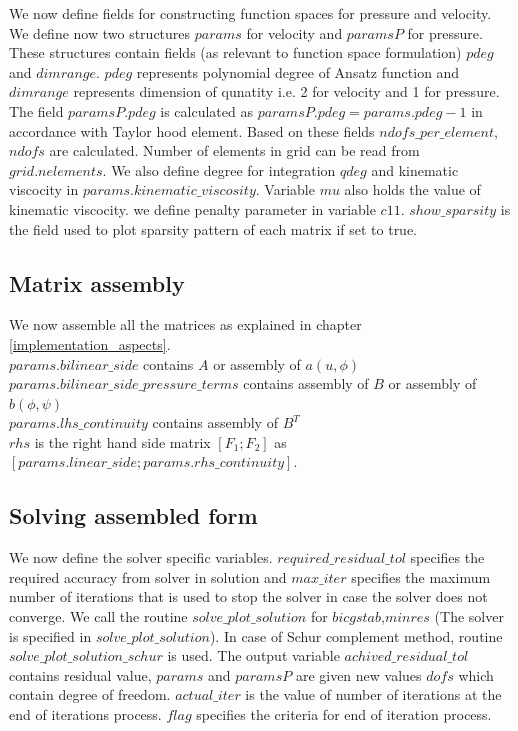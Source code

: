 \documentclass[a4paper,12pt]{book}
\begin{document}
We now define fields for constructing function spaces for pressure and velocity. We define now two structures $params$ for velocity and $paramsP$ for pressure. These structures contain fields (as relevant to function space formulation) $pdeg$ and $dimrange$. $pdeg$ represents polynomial degree of Ansatz function and $dimrange$ represents  dimension of qunatity i.e. 2 for velocity and 1 for pressure. The field $paramsP.pdeg$ is calculated as $paramsP.pdeg = params.pdeg - 1$ in accordance with Taylor hood element. Based on these fields $ndofs\_per\_element$, $ndofs$ are calculated. Number of elements in grid can be read from $grid.nelements$. We also define degree for integration $qdeg$ and kinematic viscocity in $params.kinematic\_viscosity$. Variable $mu$ also holds the value of kinematic viscocity. we define penalty parameter in variable $c11$. $show\_sparsity$ is the field used to plot sparsity pattern of each matrix if set to true.\\

\subsection{Matrix assembly}

We now assemble all the matrices as explained in chapter \ref{implementation_aspects}. \\$params.bilinear\_side$ contains $A$ or assembly of $a(u,\phi)$\\$params.bilinear\_side\_pressure\_terms$ contains assembly of $B$ or assembly of $b(\phi,\psi)$\\ $params.lhs\_continuity$ contains assembly of $B^T$\\ $rhs$ is the right hand side matrix $[F_1;F_2]$ as\\ $[params.linear\_side;params.rhs\_continuity]$. \\

\subsection{Solving assembled form}

We now define the solver specific variables. $required\_residual\_tol$ specifies the required accuracy from solver in solution and $max\_iter$ specifies the maximum number of iterations that is used to stop the solver in case the solver does not converge. We call the routine $solve\_plot\_solution$ for $bicgstab$,$minres$ (The solver is specified in $solve\_plot\_solution$). In case of Schur complement method, routine $solve\_plot\_solution\_schur$ is used. The output variable $achived\_residual\_tol$ contains residual value, $params$ and $paramsP$ are given new values $dofs$ which contain degree of freedom. $actual\_iter$ is the value of number of iterations at the end of iterations process. $flag$ specifies the criteria for end of iteration process.\\
\end{document}
